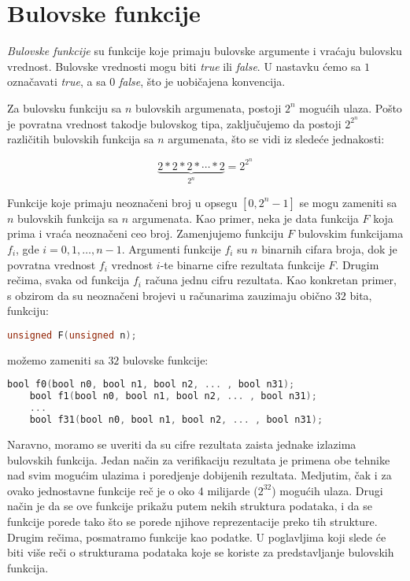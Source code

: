 \section{Bulovske funkcije}
\label{sec:BulovskeFunkcije}

\emph{Bulovske funkcije} su funkcije koje primaju bulovske argumente i vra\'c{}aju bulovsku vrednost. Bulovske vrednosti mogu biti \emph{true} ili \emph{false}. U nastavku \'c{}emo sa $1$ ozna\v{c}avati \emph{true}, a sa $0$ \emph{false}, \v{s}to je uobi\v{c}ajena konvencija.

Za bulovsku funkciju sa $n$ bulovskih argumenata, postoji $2^{n}$ mogu\'c{}ih ulaza. Po\v{s}to je povratna vrednost takodje bulovskog tipa, zaklju\v{c}ujemo da postoji $2^{2^{n}}$ razli\v{c}itih bulovskih funkcija sa $n$ argumenata, \v{s}to se vidi iz slede\'c{}e jednakosti:

\[ \underbrace{2*2*2* \dotsb *2}_{\text{$2^{n}$}} = 2^{2^{n}} \]

Funkcije koje primaju neozna\v{c}eni broj u opsegu $[0,2^{n}-1]$ se mogu zameniti sa $n$ bulovskih funkcija sa $n$ argumenata. Kao primer, neka je data funkcija $F$ koja prima i vra\'c{}a neozna\v{c}eni ceo broj. Zamenjujemo funkciju $F$ bulovskim funkcijama $f_i$, gde $i = 0, 1, \dots , n-1$. Argumenti funkcije $f_{i}$ su $n$ binarnih cifara broja, dok je povratna vrednost $f_{i}$ vrednost $i$-te binarne cifre rezultata funkcije $F$. Drugim re\v{c}ima, svaka od funkcija $f_{i}$ ra\v{c}una jednu cifru rezultata. Kao konkretan primer, s obzirom da su neozna\v{c}eni brojevi u ra\v{c}unarima zauzimaju obi\v{c}no $32$ bita, funkciju:

\begin{lstlisting}[language=C++]
    unsigned F(unsigned n);
\end{lstlisting}

\noindent mo\v{z}emo zameniti sa $32$ bulovske funkcije:

\begin{lstlisting}[language=C, emph={bool}]
    bool f0(bool n0, bool n1, bool n2, ... , bool n31);
    bool f1(bool n0, bool n1, bool n2, ... , bool n31);
    ...
    bool f31(bool n0, bool n1, bool n2, ... , bool n31);
\end{lstlisting}

Naravno, moramo se uveriti da su cifre rezultata zaista jednake izlazima bulovskih funkcija. Jedan na\v{c}in za verifikaciju rezultata je primena obe tehnike nad svim mogu\'c{}im ulazima i poredjenje dobijenih rezultata. Medjutim, \v{c}ak i za ovako jednostavne funkcije re\v{c} je o oko 4 milijarde ($2^{32}$) mogu\'c{}ih ulaza. Drugi na\v{c}in je da se ove funkcije prika\v{z}u putem nekih struktura podataka, i da se funkcije porede tako \v{s}to se porede njihove reprezentacije preko tih strukture. Drugim re\v{c}ima, posmatramo funkcije kao podatke. U poglavljima koji slede \'c{}e biti vi\v{s}e re\v{c}i o strukturama podataka koje se koriste za predstavljanje bulovskih funkcija.
